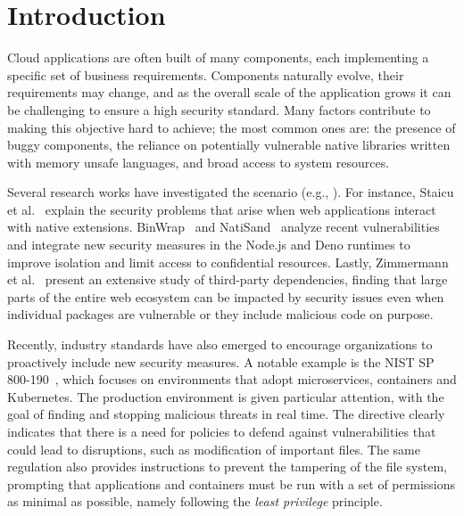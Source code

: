 \section{Introduction}
\label{dmng:sect:introduction}

Cloud applications are often built of many components, each
implementing a specific set of business requirements. Components
naturally evolve, their requirements may change, and as the overall scale
of the application grows it can be challenging to ensure a high
security standard. Many factors contribute to making this objective
hard to achieve; the most common ones are: the presence of buggy
components, the reliance on potentially vulnerable native libraries
written with memory unsafe languages, and broad access to system
resources.

Several research works have investigated the scenario (e.g.,
\cite{staicu2021bilingual, binwrap,natisand, zimmermann-risks}). For
instance, Staicu et al.~\cite{staicu2021bilingual} explain the
security problems that arise when web applications interact with
native extensions. BinWrap~\cite{binwrap} and NatiSand~\cite{natisand}
analyze recent vulnerabilities and integrate new security
measures in the Node.js and Deno runtimes to improve isolation and
limit access to confidential resources. Lastly, 
Zimmermann et al.~\cite{zimmermann-risks} present an extensive study of third-party
dependencies, finding that large parts of the entire web ecosystem can
be impacted by security issues even when individual packages are
vulnerable or they include malicious code on purpose.

Recently, industry standards have also emerged to encourage
organizations to proactively include new security measures. A notable
example is the NIST SP 800-190~\cite{nist-sp800-190}, which focuses on
environments that adopt microservices, containers and Kubernetes. The
production environment is given particular attention, with the goal of
finding and stopping malicious threats in real time.  The directive
clearly indicates that there is a need for policies to defend against
vulnerabilities that could lead to disruptions, such as modification
of important files. The same regulation also provides instructions to
prevent the tampering of the file system, prompting that applications
and containers must be run with a set of permissions as minimal as
possible, namely following the {\em least privilege} principle.

